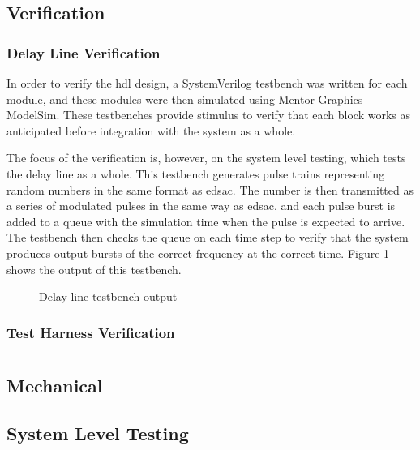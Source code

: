 \section{ Verification}


\subsection{Delay Line Verification}
In order to verify the \gls{hdl} design, a SystemVerilog testbench was written for each module, and these modules were then simulated using Mentor Graphics ModelSim. These testbenches provide stimulus to verify that each block works as anticipated before integration with the system as a whole.

The focus of the verification is, however, on the system level testing, which tests the delay line as a whole. This testbench generates pulse trains representing random numbers in the same format as \gls{edsac}. The number is then transmitted as a series of modulated pulses in the same way as \gls{edsac}, and each pulse burst is added to a queue with the simulation time when the pulse is expected to arrive. The testbench then checks the queue on each time step to verify that the system produces output bursts of the correct frequency at the correct time. Figure \ref{fig:delay-line-tb-output} shows the output of this testbench.


\begin{figure}[ht]
	
	\centering
	\dummyfigure
	
	\caption{Delay line testbench output}
	
	\label{fig:delay-line-tb-output}
\end{figure}

\subsection{Test Harness Verification}

\chapter{}

\section{Mechanical}

\section{System Level Testing}

